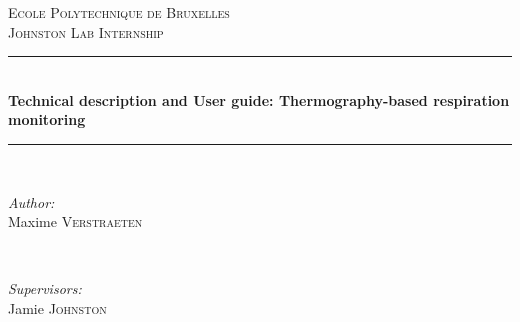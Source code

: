 \documentclass[a4paper]{article}
\begin{document}
\begin{titlepage}

\newcommand{\HRule}{\rule{\linewidth}{0.5mm}} %

\center %
 

\textsc{\LARGE Ecole Polytechnique de Bruxelles}\\[1.5cm] %
\textsc{\large Johnston Lab Internship}\\[0.5cm] %


\HRule \\[0.4cm]
{ \huge \bfseries Technical description and User guide: Thermography-based respiration monitoring}\\[0.4cm] %
\HRule \\[1.5cm]
 

\begin{minipage}{0.4\textwidth}
\begin{flushleft} \large
\emph{Author:}\\
Maxime \textsc{Verstraeten} %
\end{flushleft}
\end{minipage}
~
\begin{minipage}{0.4\textwidth}
\begin{flushright} \large
\emph{Supervisors:} \\
Jamie \textsc{Johnston}\\[0.3cm] %
\end{flushright}
\end{minipage}\\[2cm]



\end{titlepage}
\end{document}
